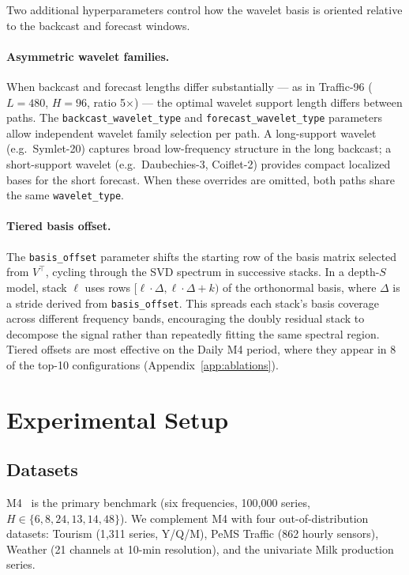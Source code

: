 \documentclass[11pt,a4paper]{article}
\begin{document}
Two additional hyperparameters control how the wavelet basis is oriented relative to the backcast and forecast windows.

\paragraph{Asymmetric wavelet families.} When backcast and forecast lengths differ substantially --- as in Traffic-96 ($L=480$, $H=96$, ratio 5$\times$) --- the optimal wavelet support length differs between paths. The \texttt{backcast\_wavelet\_type} and \texttt{forecast\_wavelet\_type} parameters allow independent wavelet family selection per path. A long-support wavelet (e.g.\ Symlet-20) captures broad low-frequency structure in the long backcast; a short-support wavelet (e.g.\ Daubechies-3, Coiflet-2) provides compact localized bases for the short forecast. When these overrides are omitted, both paths share the same \texttt{wavelet\_type}.

\paragraph{Tiered basis offset.} The \texttt{basis\_offset} parameter shifts the starting row of the basis matrix selected from $V^\top$, cycling through the SVD spectrum in successive stacks. In a depth-$S$ model, stack $\ell$ uses rows $[\ell \cdot \Delta, \ell \cdot \Delta + k)$ of the orthonormal basis, where $\Delta$ is a stride derived from \texttt{basis\_offset}. This spreads each stack's basis coverage across different frequency bands, encouraging the doubly residual stack to decompose the signal rather than repeatedly fitting the same spectral region. Tiered offsets are most effective on the Daily M4 period, where they appear in 8 of the top-10 configurations (Appendix~\ref{app:ablations}).


\section{Experimental Setup}
\label{sec:experimental_setup}

\subsection{Datasets}

M4~\citep{makridakis2020m4} is the primary benchmark (six frequencies, 100{,}000 series, $H \in \{6, 8, 24, 13, 14, 48\}$). We complement M4 with four out-of-distribution datasets: Tourism (1{,}311 series, Y/Q/M), PeMS Traffic (862 hourly sensors), Weather (21 channels at 10-min resolution), and the univariate Milk production series.
\end{document}
